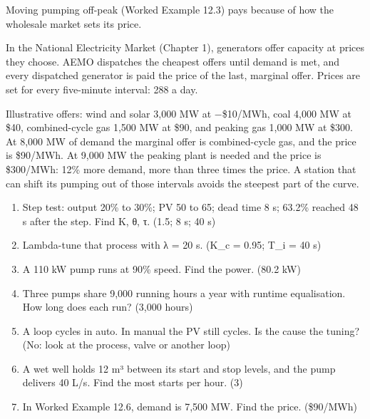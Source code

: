 Moving pumping off-peak (Worked Example 12.3) pays because of how the wholesale market sets its price.

 In the National Electricity Market (Chapter 1), generators offer capacity at prices they choose. AEMO dispatches the cheapest offers until demand is met, and every dispatched generator is paid the price of the last, marginal offer. Prices are set for every five-minute interval: 288 a day.

 Illustrative offers: wind and solar 3,000 MW at −\$10/MWh, coal 4,000 MW at \$40, combined-cycle gas 1,500 MW at \$90, and peaking gas 1,000 MW at \$300. At 8,000 MW of demand the marginal offer is combined-cycle gas, and the price is \$90/MWh. At 9,000 MW the peaking plant is needed and the price is \$300/MWh: 12\% more demand, more than three times the price. A station that can shift its pumping out of those intervals avoids the steepest part of the curve.

\begin{enumerate}
\item Step test: output 20\% to 30\%; PV 50 to 65; dead time 8 s; 63.2\% reached 48 s after the step. Find K, θ, τ. (1.5; 8 s; 40 s)
\item Lambda-tune that process with λ = 20 s. (K\_c = 0.95; T\_i = 40 s)
\item A 110 kW pump runs at 90\% speed. Find the power. (80.2 kW)
\item Three pumps share 9,000 running hours a year with runtime equalisation. How long does each run? (3,000 hours)
\item A loop cycles in auto. In manual the PV still cycles. Is the cause the tuning? (No: look at the process, valve or another loop)
\item A wet well holds 12 m³ between its start and stop levels, and the pump delivers 40 L/s. Find the most starts per hour. (3)
\item In Worked Example 12.6, demand is 7,500 MW. Find the price. (\$90/MWh)
\end{enumerate}
